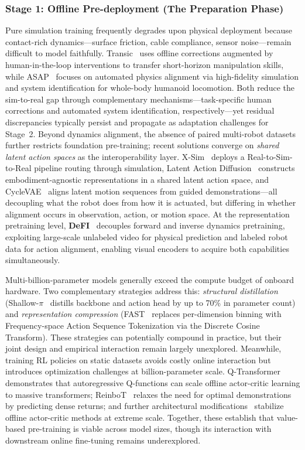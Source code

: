 \documentclass[acmsmall,screen,review,anonymous]{acmart}
\begin{document}
\subsubsection{Stage 1: Offline Pre-deployment (The Preparation Phase)}

Pure simulation training frequently degrades upon physical deployment because contact-rich dynamics---surface friction, cable compliance, sensor noise---remain difficult to model faithfully. Transic~\cite{jiang2024transic} uses offline corrections augmented by human-in-the-loop interventions to transfer short-horizon manipulation skills, while ASAP~\cite{he2025asap} focuses on automated physics alignment via high-fidelity simulation and system identification for whole-body humanoid locomotion. Both reduce the sim-to-real gap through complementary mechanisms---task-specific human corrections and automated system identification, respectively---yet residual discrepancies typically persist and propagate as adaptation challenges for Stage~2. Beyond dynamics alignment, the absence of paired multi-robot datasets further restricts foundation pre-training; recent solutions converge on \emph{shared latent action spaces} as the interoperability layer. X-Sim~\cite{dan2025xsim} deploys a Real-to-Sim-to-Real pipeline routing through simulation, Latent Action Diffusion~\cite{bauer2025latentaction} constructs embodiment-agnostic representations in a shared latent action space, and CycleVAE~\cite{dastider2025cyclevae} aligns latent motion sequences from guided demonstrations---all decoupling what the robot does from how it is actuated, but differing in whether alignment occurs in observation, action, or motion space. At the representation pretraining level, \textbf{DeFI}~\cite{zhang2026disentangled} decouples forward and inverse dynamics pretraining, exploiting large-scale unlabeled video for physical prediction and labeled robot data for action alignment, enabling visual encoders to acquire both capabilities simultaneously.

Multi-billion-parameter models generally exceed the compute budget of onboard hardware. Two complementary strategies address this: \emph{structural distillation} (Shallow-$\pi$~\cite{jeon2026shallowpi} distills backbone and action head by up to 70\% in parameter count) and \emph{representation compression} (FAST~\cite{pertsch2025fast} replaces per-dimension binning with Frequency-space Action Sequence Tokenization via the Discrete Cosine Transform). These strategies can potentially compound in practice, but their joint design and empirical interaction remain largely unexplored. Meanwhile, training RL policies on static datasets avoids costly online interaction but introduces optimization challenges at billion-parameter scale. Q-Transformer~\cite{chebotar2023qtransformer} demonstrates that autoregressive Q-functions can scale offline actor-critic learning to massive transformers; ReinboT~\cite{zhang2025reinbot} relaxes the need for optimal demonstrations by predicting dense returns; and further architectural modifications~\cite{springenberg2024offlineactorcritic} stabilize offline actor-critic methods at extreme scale. Together, these establish that value-based pre-training is viable across model sizes, though its interaction with downstream online fine-tuning remains underexplored.
\end{document}
